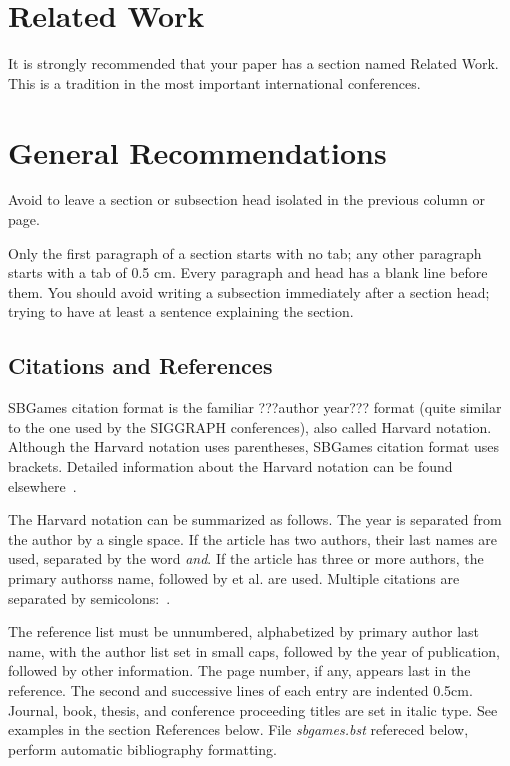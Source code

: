 \documentclass[a4paper]{sbgames}               %
\begin{document}
\section{Related Work}
\label{sec:related-work}
It is strongly recommended that your paper has a section named Related
Work. This is a tradition in the most important international
conferences.


\section{General Recommendations}
\label{sec:gener-recomm}

Avoid to leave a section or subsection head isolated in the previous
column or page.

Only the first paragraph of a section starts with no tab; any other
paragraph starts with a tab of 0.5 cm. Every paragraph and head has a
blank line before them. You should avoid writing a subsection
immediately after a section head; trying to have at least a sentence
explaining the section.


\subsection{Citations and References}

SBGames citation format is the familiar ???author year??? format (quite
similar to the one used by the SIGGRAPH conferences), also called
Harvard notation. Although the Harvard notation uses parentheses,
SBGames citation format uses brackets. Detailed information about the
Harvard notation can be found elsewhere~\cite{Holland:2006:CRH}.

The Harvard notation can be summarized as follows. The year is
separated from the author by a single space. If the article has two
authors, their last names are used, separated by the word \emph{and}. If
the article has three or more authors, the primary authorss name,
followed by et al. are used. Multiple citations are separated by
semicolons:~\cite{Park:2006:DSI,kartch:2000:ERA}.

The reference list must be unnumbered, alphabetized by primary
author last name, with the author list set in small caps, followed
by the year of publication, followed by other information. The page
number, if any, appears last in the reference. The second and
successive lines of each entry are indented 0.5cm. Journal, book,
thesis, and conference proceeding titles are set in italic type. See
examples in the section References below. File \emph{sbgames.bst}
refereced below, perform automatic bibliography formatting.
\end{document}
